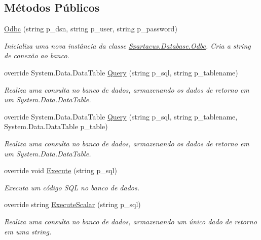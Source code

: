 \subsection*{Métodos Públicos}
\begin{DoxyCompactItemize}
\item 
\hyperlink{classSpartacus_1_1Database_1_1Odbc_a2ea31921d3a0d8e25b73a05e89784bdc}{Odbc} (string p\+\_\+dsn, string p\+\_\+user, string p\+\_\+password)
\begin{DoxyCompactList}\small\item\em Inicializa uma nova instância da classe \hyperlink{classSpartacus_1_1Database_1_1Odbc}{Spartacus.\+Database.\+Odbc}. Cria a string de conexão ao banco. \end{DoxyCompactList}\item 
override System.\+Data.\+Data\+Table \hyperlink{classSpartacus_1_1Database_1_1Odbc_a2332e648d04783ce92a9680f6cd69411}{Query} (string p\+\_\+sql, string p\+\_\+tablename)
\begin{DoxyCompactList}\small\item\em Realiza uma consulta no banco de dados, armazenando os dados de retorno em um System.\+Data.\+Data\+Table. \end{DoxyCompactList}\item 
override System.\+Data.\+Data\+Table \hyperlink{classSpartacus_1_1Database_1_1Odbc_a7b6d07dad45f3124d081976d2b51ed4b}{Query} (string p\+\_\+sql, string p\+\_\+tablename, System.\+Data.\+Data\+Table p\+\_\+table)
\begin{DoxyCompactList}\small\item\em Realiza uma consulta no banco de dados, armazenando os dados de retorno em um System.\+Data.\+Data\+Table. \end{DoxyCompactList}\item 
override void \hyperlink{classSpartacus_1_1Database_1_1Odbc_a37ff1148e0cb0c03941189bf21d9b8ed}{Execute} (string p\+\_\+sql)
\begin{DoxyCompactList}\small\item\em Executa um código S\+Q\+L no banco de dados. \end{DoxyCompactList}\item 
override string \hyperlink{classSpartacus_1_1Database_1_1Odbc_ab4fcfd110084f00e66aded3478f13aca}{Execute\+Scalar} (string p\+\_\+sql)
\begin{DoxyCompactList}\small\item\em Realiza uma consulta no banco de dados, armazenando um único dado de retorno em uma string. \end{DoxyCompactList}\end{DoxyCompactItemize}
